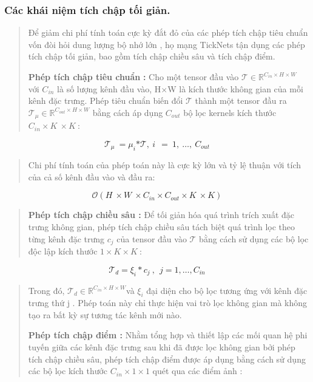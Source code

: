 \documentclass[
]{article}
\begin{document}
\hypertarget{cuxe1c-khuxe1i-niux1ec7m-tuxedch-chux1eadp-tux1ed1i-giux1ea3n.}{%
\subsubsection{Các khái niệm tích chập tối
giản.}\label{cuxe1c-khuxe1i-niux1ec7m-tuxedch-chux1eadp-tux1ed1i-giux1ea3n.}}

\begin{quote}
Để giảm chi phí tính toán cực kỳ đắt đỏ của các phép tích chập tiêu
chuẩn vốn đòi hỏi dung lượng bộ nhớ lớn , họ mạng TickNets tận dụng các
phép tích chập tối giản, bao gồm tích chập chiều sâu và tích chập điểm.

\textbf{Phép tích chập tiêu chuẩn} \textbf{:} Cho một tensor đầu vào
\(\mathcal{T \in}\mathbb{R}^{C_{in} \times H \times W}\) với \(C_{in}\)
là số lượng kênh đầu vào, H\(\times\)W là kích thước không gian của mỗi
kênh đặc trưng. Phép tiêu chuẩn biến đổi \(\mathcal{T}\) thành một
tensor đầu ra
\(\mathcal{T}_{\mu} \in \mathbb{R}^{C_{out} \times H \times W}\) bằng
cách áp dụng \(C_{out}\) bộ lọc kernels kích thước
\(C_{in} \times K\  \times K\ :\)
\end{quote}

\[\mathcal{T}_{\mu}\  = \mu_{i}\mathcal{*T,\ }i\ \  = \ 1,\ \ldots,\ C_{out}\]

\begin{quote}
Chi phí tính toán của phép toán này là cực kỳ lớn và tỷ lệ thuận với
tích của cả số kênh đầu vào và đầu ra:
\end{quote}

\[\mathcal{O}\left( H\  \times W\  \times C_{in} \times C_{out} \times K\  \times K \right)\]

\begin{quote}
\textbf{Phép tích chập chiều sâu :} Để tối giản hóa quá trình trích xuất
đặc trưng không gian, phép tích chập chiều sâu tách biệt quá trình lọc
theo từng kênh đặc trưng \(c_{j}\) của tensor đầu vào \(\mathcal{T}\)
bằng cách sử dụng các bộ lọc độc lập kích thước
\(1 \times K \times K\ \):
\end{quote}

\[\mathcal{T}_{d} = \xi_{i}*c_{j}\ ,\ \ j = 1,\ldots,C_{in}\]

\begin{quote}
Trong đó,
\(\mathcal{T}_{d} \in \mathbb{R}^{C_{in} \times H \times W}\)và
\(\xi_{i}\) đại diện cho bộ lọc tương ứng với kênh đặc trưng thứ j .
Phép toán này chỉ thực hiện vai trò lọc không gian mà không tạo ra bất
kỳ sự tương tác kênh mới nào.

\textbf{Phép tích chập điểm :} Nhằm tổng hợp và thiết lập các mối quan
hệ phi tuyến giữa các kênh đặc trưng sau khi đã được lọc không gian bởi
phép tích chập chiều sâu, phép tích chập điểm được áp dụng bằng cách sử
dụng các bộ lọc kích thước \(C_{in} \times 1 \times 1\) quét qua các
điểm ảnh :
\end{quote}
\end{document}
